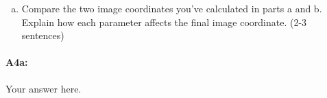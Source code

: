 \begin{enumerate} [(a)]
\begin{enumerate} [(i)]
\item A camera with focal length in both $x$ and $y$ directions of $2$, a translation of $5$ along the x-axis, and no skew or rotation.
\vspace{-0.3cm}
\begin{align*}
    \begin{pmatrix} 
    \_\_ & \_\_ & $0$ \\ 
    $0$ & \_\_ & $0$ \\ 
    $0$ & $0$ & $1$ \end{pmatrix} *
    \begin{pmatrix} 
    \_\_ & \_\_ & \_\_ & \_\_ \\ 
    \_\_ & \_\_ & \_\_ & \_\_ \\ 
    \_\_ & \_\_ & \_\_ & \_\_ \end{pmatrix} * 
    \begin{pmatrix} 
    $30$ \\ 
    $-20$ \\ 
    $10$ \\ 
    $1$ \end{pmatrix}
    = \begin{pmatrix}  \_\_ \\ \_\_ \\ \_\_ \end{pmatrix}
    = \_\_ * \begin{pmatrix}  \_\_ \\ \_\_ \\ $1$ \end{pmatrix}
\end{align*}

\end{enumerate}
\item Compare the two image coordinates you've calculated in parts a and b. Explain how each parameter affects the final image coordinate. (2-3 sentences)


\end{enumerate}

\paragraph{A4a:} Your answer here.




